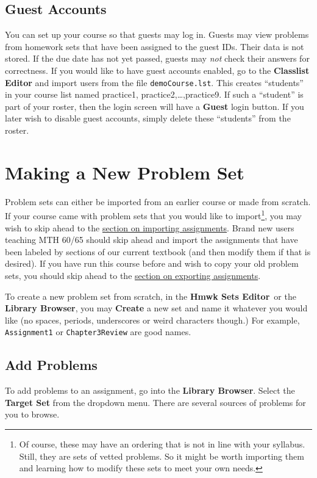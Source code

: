 \documentclass[12pt]{article}
\newcommand{\menu}[1]{\textbf{#1}}
\newcommand{\HSE}{\menu{Hmwk Sets Editor}}
\begin{document}
\subsection{Guest Accounts}
You can set up your course so that guests may log in.  Guests may view problems from homework sets that have been assigned to the guest IDs.  Their data is not stored.  If the due date has not yet passed, guests may \emph{not} check their answers for correctness. If you would like to have guest accounts enabled, go to the \menu{Classlist Editor} and import users from the file \texttt{demoCourse.lst}.  This creates ``students'' in your course list named practice1, practice2,\ldots,practice9.  If such a ``student'' is part of your roster, then the login screen will have a \menu{Guest} login button. If you later wish to disable guest accounts, simply delete these ``students'' from the roster.


\section{Making a New Problem Set}\label{makeset}
Problem sets can either be imported from an earlier course or made from scratch.  If your course came with problem sets that you would like to import\footnote{Of course, these may have an ordering that is not in line with your syllabus. Still, they are sets of vetted problems. So it might be worth importing them and learning how to modify these sets to meet your own needs.}, you may wish to skip ahead to the \hyperref[imp]{section on importing assignments}.  Brand new users teaching MTH 60/65 should skip ahead and import the assignments that have been labeled by sections of our current textbook (and then modify them if that is desired). If you have run this course before and wish to copy your old problem sets, you should skip ahead to the \hyperref[exp]{section on exporting assignments}.

To create a new problem set from scratch, in the \HSE\ or the \menu{Library Browser}, you may \menu{Create} a new set and name it whatever you would like (no spaces, periods, underscores or weird characters though.)  For example, \texttt{Assignment1} or \texttt{Chapter3Review} are good names.

\subsection{Add Problems}  To add problems to an assignment, go into the \menu{Library Browser}.  Select the \menu{Target Set} from the dropdown menu.  There are several sources of problems for you to browse.  
\end{document}
